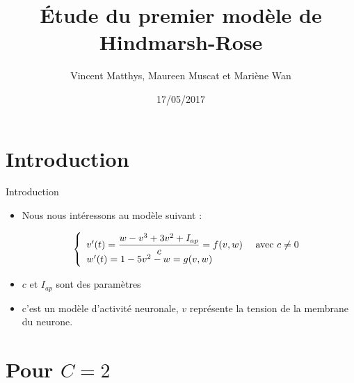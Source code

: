 \documentclass[xcolor={dvipsnames},10pt]{beamer}
\title[Le modèle de Hindmarsh-Rose]{Étude du premier modèle de Hindmarsh-Rose}
\author{Vincent Matthys, Maureen Muscat et Mariène Wan}
\institute{Master 1 BIM \\ Université Pierre et Marie Curie}
\date{17/05/2017}
\begin{document}
\begin{frame}
\titlepage
\end{frame}


\section*{Introduction}

\begin{frame}{Introduction}

\begin{itemize}
  \item Nous nous intéressons au modèle suivant :

\begin{equation}
\left\{
\begin{array}{l l}
v'(t)= \displaystyle{\frac{w - v^3 + 3v^2 +I_{ap}}{c}} = f(v,w) & \text{ avec } c\neq 0\\
w'(t) = 1 - 5 v^2 - w = g(v,w) & \\
\end{array}
\right.
\end{equation}

 \item $c$ et $I_{ap}$ sont des paramètres
 \item c'est un modèle d'activité neuronale, $v$ représente la tension de la membrane du neurone.

\end{itemize}
\end{frame}

\begin{frame}
\tableofcontents %
\end{frame}

\section{Pour \texorpdfstring{$C=2$}{Lg}}
\end{document}
